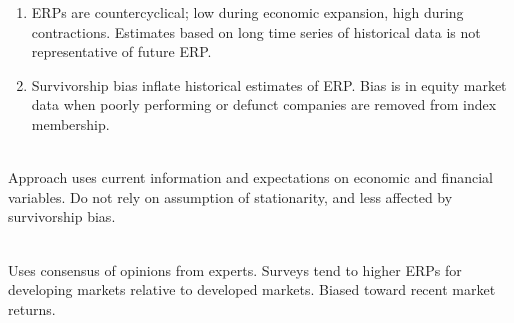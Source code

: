 \begin{remark} 
\begin{enumerate}[label=\roman*.]
\setlength{\itemsep}{0pt}
\item ERPs are countercyclical; low during economic expansion, high during contractions. Estimates based on long time series of historical data is not representative of future ERP.
\item Survivorship bias inflate historical estimates of ERP. Bias is in equity market data when poorly performing or defunct companies are removed from index membership.
\end{enumerate}
\end{remark}

\begin{method} \\
Approach uses current information and expectations on economic and financial variables. Do not rely on assumption of stationarity, and less affected by survivorship bias.
\end{method}

\begin{method} \\
Uses consensus of opinions from experts. Surveys tend to higher ERPs for developing markets relative to developed markets. Biased toward recent market returns.
\end{method}

